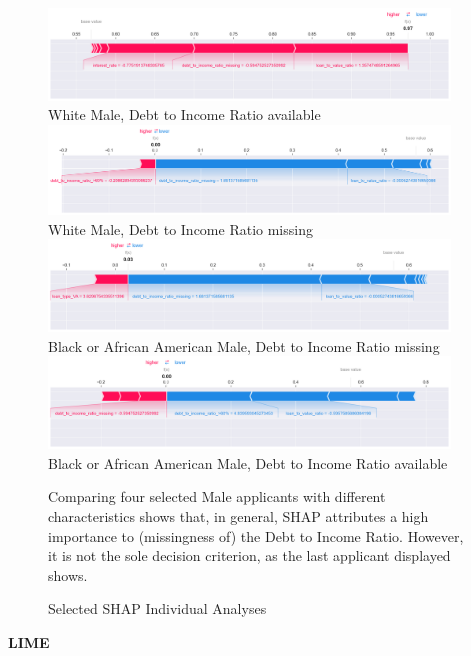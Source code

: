 \begin{figure}[!htbp]
    \centering
    \includegraphics[width=0.95\textwidth]{images/SHAP_Individual_Analyses/SHAP_individual_0.png}
    \small
    White Male, Debt to Income Ratio available
    \includegraphics[width=0.95\textwidth]{images/SHAP_Individual_Analyses/SHAP_individual_1.png}
    \small
    White Male, Debt to Income Ratio missing
    \includegraphics[width=0.95\textwidth]{images/SHAP_Individual_Analyses/SHAP_individual_21.png}
    \small
    Black or African American Male, Debt to Income Ratio missing
    \includegraphics[width=0.95\textwidth]{images/SHAP_Individual_Analyses/SHAP_individual_139.png}
    \small
    Black or African American Male, Debt to Income Ratio available
    \caption{Selected SHAP Individual Analyses}
    \medskip
    \small
    Comparing four selected Male applicants with different characteristics shows that, in general, SHAP attributes a high importance to (missingness of) the Debt to Income Ratio. However, it is not the sole decision criterion, as the last applicant displayed shows.
    \label{fig:SHAP_Individual_Analyses}
\end{figure}

\textbf{LIME}

